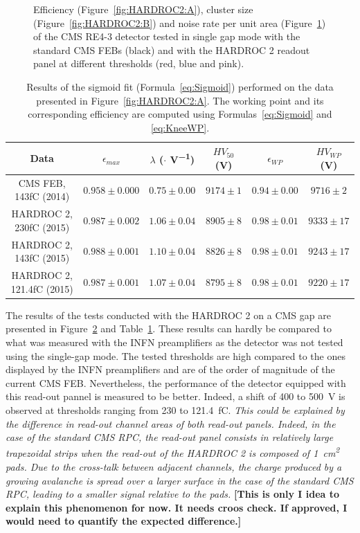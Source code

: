 \begin{figure}[H]
\begin{subfigure}{\linewidth}
			\caption{\label{fig:HARDROC2:C}}
		\end{subfigure}
		\caption{\label{fig:HARDROC2} Efficiency (Figure~\ref{fig:HARDROC2:A}), cluster size (Figure~\ref{fig:HARDROC2:B}) and noise rate per unit area (Figure~\ref{fig:HARDROC2:C}) of the CMS RE4-3 detector tested in single gap mode with the standard CMS FEBs (black) and with the HARDROC 2 readout panel at different thresholds (red, blue and pink).}
	\end{figure}
	
	\begin{table}[H]
		\caption{\label{tab:HARDROC2} Results of the sigmoid fit (Formula~\ref{eq:Sigmoid}) performed on the data presented in Figure~\ref{fig:HARDROC2:A}. The working point and its corresponding efficiency are computed using Formulas~\ref{eq:Sigmoid} and \ref{eq:KneeWP}.}
		\footnotesize
		\begin{tabular}{|c|c|c|c|c|c|}
			\hline
			Data & $\epsilon_{max}$ & $\lambda$ ($\cdot$\Ord{-2} \si{V^{-1}}) & $HV_{50}$ (\si{V}) & $\epsilon_{WP}$ & $HV_{WP}$ (\si{V}) \\ 
			\hline
			CMS FEB, 143fC (2014) & $0.958 \pm 0.000$ & $0.75 \pm 0.00$ & $9174 \pm 1$ & $0.94 \pm 0.00$ & $9716 \pm 2$\\ 
			\hline
			HARDROC 2, 230fC (2015) & $0.987 \pm 0.002$ & $1.06 \pm 0.04$ & $8905 \pm 8$ & $0.98 \pm 0.01$ & $9333 \pm 17$\\ 
			\hline
			HARDROC 2, 143fC (2015) & $0.988 \pm 0.001$ & $1.10 \pm 0.04$ & $8826 \pm 8$ & $0.98 \pm 0.01$ & $9243 \pm 17$\\ 
			\hline
			HARDROC 2, 121.4fC (2015) & $0.987 \pm 0.001$ & $1.07 \pm 0.04$ & $8795 \pm 8$ & $0.98 \pm 0.01$ & $9220 \pm 17$\\ 
			\hline
		\end{tabular}
	\end{table}
	
	The results of the tests conducted with the HARDROC 2 on a CMS gap are presented in Figure~\ref{fig:HARDROC2} and Table~\ref{tab:HARDROC2}. These results can hardly be compared to what was measured with the INFN preamplifiers as the detector was not tested using the single-gap mode. The tested thresholds are high compared to the ones displayed by the INFN preamplifiers and are of the order of magnitude of the current CMS FEB. Nevertheless, the performance of the detector equipped with this read-out pannel is measured to be better. Indeed, a shift of 400 to \SI{500}{V} is observed at thresholds ranging from 230 to \SI{121.4}{fC}. \textit{This could be explained by the difference in read-out channel areas of both read-out panels. Indeed, in the case of the standard CMS RPC, the read-out panel consists in relatively large trapezoidal strips when the read-out of the HARDROC 2 is composed of \SI{1}{cm^2} pads. Due to the cross-talk between adjacent channels, the charge produced by a growing avalanche is spread over a larger surface in the case of the standard CMS RPC, leading to a smaller signal relative to the pads.} \textbf{[This is only I idea to explain this phenomenon for now. It needs croos check. If approved, I would need to quantify the expected difference.]}
	
